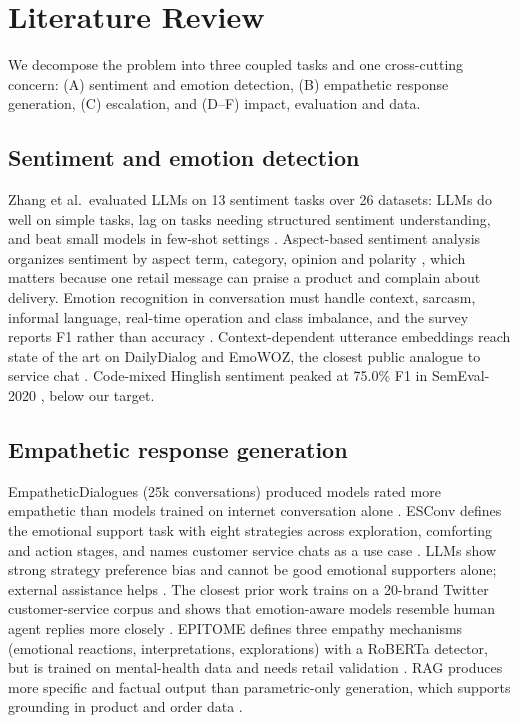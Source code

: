 \documentclass[11pt,a4paper]{article}
\begin{document}
\section{Literature Review}\label{sec:lit}
We decompose the problem into three coupled tasks and one cross-cutting concern: (A) sentiment and emotion detection, (B) empathetic response generation, (C) escalation, and (D--F) impact, evaluation and data.

\subsection{Sentiment and emotion detection}
Zhang et al.\ evaluated LLMs on 13 sentiment tasks over 26 datasets: LLMs do well on simple tasks, lag on tasks needing structured sentiment understanding, and beat small models in few-shot settings \cite{zhang2024}. Aspect-based sentiment analysis organizes sentiment by aspect term, category, opinion and polarity \cite{zhang2022absa}, which matters because one retail message can praise a product and complain about delivery. Emotion recognition in conversation must handle context, sarcasm, informal language, real-time operation and class imbalance, and the survey reports F1 rather than accuracy \cite{pereira2022}. Context-dependent utterance embeddings reach state of the art on DailyDialog and EmoWOZ, the closest public analogue to service chat \cite{pereira2023}. Code-mixed Hinglish sentiment peaked at 75.0\% F1 in SemEval-2020 \cite{patwa2020}, below our target.

\subsection{Empathetic response generation}
EmpatheticDialogues (25k conversations) produced models rated more empathetic than models trained on internet conversation alone \cite{rashkin2019}. ESConv defines the emotional support task with eight strategies across exploration, comforting and action stages, and names customer service chats as a use case \cite{liu2021esc}. LLMs show strong strategy preference bias and cannot be good emotional supporters alone; external assistance helps \cite{kang2024}. The closest prior work trains on a 20-brand Twitter customer-service corpus and shows that emotion-aware models resemble human agent replies more closely \cite{agarwal2021}. EPITOME defines three empathy mechanisms (emotional reactions, interpretations, explorations) with a RoBERTa detector, but is trained on mental-health data and needs retail validation \cite{sharma2020}. RAG produces more specific and factual output than parametric-only generation, which supports grounding in product and order data \cite{lewis2020}.
\end{document}
